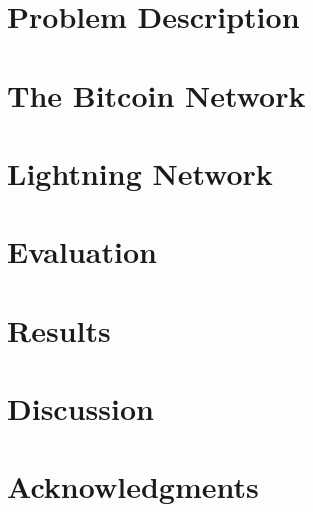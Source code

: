 \section{Problem Description}
    \label{sec:problem}
    

\clearpage

   
   
\clearpage
\section{The Bitcoin Network}
    \label{sec:bitcoin}
    
\clearpage

    \label{sec:scaling}
    
\clearpage
\section{Lightning Network}
    \label{sec:lightning:network}
    
\clearpage
\section{Evaluation}
\clearpage
\section{Results}
\clearpage
\section{Discussion}
    \label{sec:discussion}
\clearpage
\section{Acknowledgments}
    \label{sec:acknowledgments}
